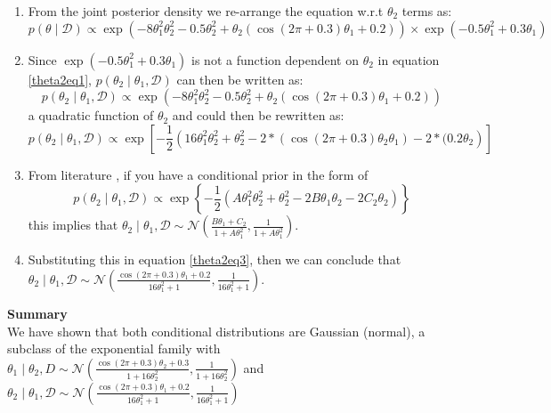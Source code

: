 \documentclass[12pt]{article}
\begin{document}
\begin{enumerate}
    \item From the joint posterior density we re-arrange the equation w.r.t $\theta_2$ terms as:
\begin{equation}\label{theta2eq1}
p(\theta \mid \mathcal{D}) \propto \exp \left( -8\theta_1^2\theta_2^2 - 0.5\theta_2^2 + \theta_2(\cos(2\pi + 0.3)\theta_1 + 0.2) \right) \times \exp \left( -0.5\theta_1^2 + 0.3\theta_1 \right) 
\end{equation} 
\item Since  $\exp  \left( -0.5\theta_1^2 + 0.3\theta_1 \right)$  is not a function dependent on $\theta_2$ in equation  \ref{theta2eq1}, $p(\theta_2 \mid \theta_1 ,\mathcal{D}) $ can then be written as:
 \begin{equation}\label{theta2eq2}
p(\theta_2 \mid \theta_1 ,\mathcal{D}) \propto \exp \left( -8\theta_1^2\theta_2^2 - 0.5\theta_2^2 + \theta_2(\cos(2\pi + 0.3)\theta_1 + 0.2) \right)
\end{equation} 
a quadratic function of $\theta_2$ and could then be rewritten as:
 \begin{equation}\label{theta2eq3}
p(\theta_2 \mid \theta_1 ,\mathcal{D}) \propto \exp\left[- \frac{1}{2}\left( 16\theta_1^2\theta_2^2 + \theta_2^2 - 2*(\cos(2\pi + 0.3)\theta_2 \theta_1) - 2*(0.2\theta_2 \right)\right]
\end{equation}

\item From literature \cite{gelman1995bayesian} \cite{author2024notes}, if you have a conditional prior in the form of 
 \begin{equation}\label{theta2eq4}
p(\theta_2 \mid \theta_1, \mathcal{D}) \propto \exp\left\{ -\frac{1}{2} \left( A\theta_1^2\theta_2^2 + \theta_2^2 - 2B\theta_1\theta_2 - 2C_2\theta_2 \right) \right\}
\end{equation}
 this implies that $\theta_2 \mid \theta_1, \mathcal{D} \sim \mathcal{N} \left( \frac{B\theta_1 + C_2}{1 + A\theta_1^2}, \frac{1}{1 + A\theta_1^2} \right)$.
\item Substituting this in equation \ref{theta2eq3}, then we can conclude that $\theta_2 \mid \theta_1, \mathcal{D} \sim \mathcal{N} \left( \frac{\cos(2\pi + 0.3)\theta_1 + 0.2}{16\theta_1^2 + 1}, \frac{1}{16\theta_1^2 + 1}\right)$.   
\end{enumerate}

\textbf{Summary} \\
We have shown that both conditional distributions are Gaussian (normal), a subclass of the exponential family with $\theta_1 \mid \theta_2, D \sim \mathcal{N} \left( \frac{\cos(2\pi+0.3)\theta_2 + 0.3}{1 + 16\theta_2^2}, \frac{1}{1 + 16\theta_2^2} \right)$ and $\theta_2 \mid \theta_1, \mathcal{D} \sim \mathcal{N} \left( \frac{\cos(2\pi + 0.3)\theta_1 + 0.2}{16\theta_1^2 + 1}, \frac{1}{16\theta_1^2 + 1}\right)$
\end{document}
